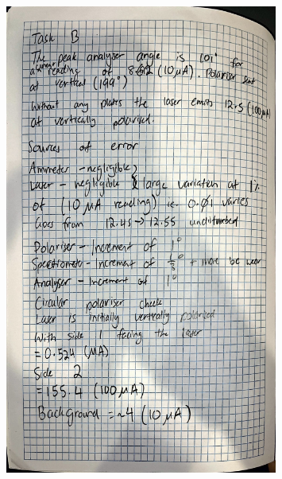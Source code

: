 \documentclass{article}
\begin{document}
\begin{figure}[H]
    \centering
    \includegraphics[width=0.8\textwidth]{labbook3.jpg}
\end{figure}
\end{document}
